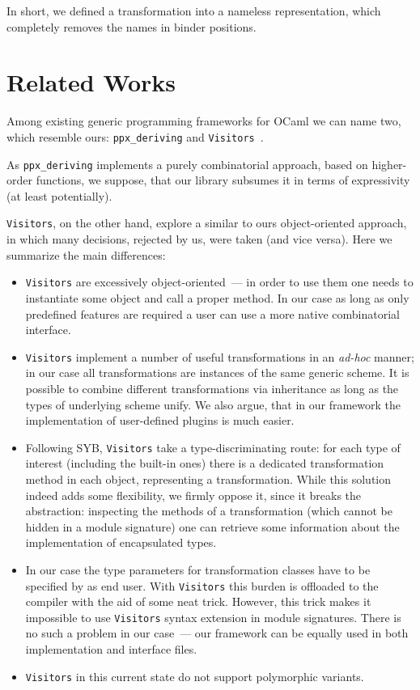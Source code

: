 \documentclass[twocolumn,8pt]{extarticle}
\newcommand{\cd}[1]{\texttt{#1}}
\begin{document}
In short, we defined a transformation into a nameless representation, which completely removes the names in binder
positions.

\section{Related Works}

Among existing generic programming frameworks for OCaml we can name two, which resemble ours: \cd{ppx\_deriving} and \cd{Visitors}~\cite{Visitors}.

As \cd{ppx\_deriving} implements a purely combinatorial approach, based on higher-order functions, we suppose, that our library subsumes it in terms
of expressivity (at least potentially).

\cd{Visitors}, on the other hand, explore a similar to ours object-oriented approach, in which many decisions, rejected by us, were taken (and vice versa). Here
we summarize the main differences:

\begin{itemize}
   \item \cd{Visitors} are excessively object-oriented~--- in order to use them one needs to instantiate some object and call a proper method. In our case as long as
     only predefined features are required a user can use a more native combinatorial interface.
     
   \item \cd{Visitors} implement a number of useful transformations in an \emph{ad-hoc} manner; in our case all transformations are instances of the
     same generic scheme. It is possible to combine different transformations via inheritance as long as the types of underlying scheme unify. We also argue, that
     in our framework the implementation of user-defined plugins is much easier.
     
   \item Following SYB, \cd{Visitors} take a type-discriminating route: for each type of interest (including the built-in ones) there is a dedicated
     transformation method in each object, representing a transformation. While this solution indeed adds some flexibility, we firmly oppose it, since it
     breaks the abstraction: inspecting the methods of a transformation (which cannot be hidden in a module signature) one can retrieve some
     information about the implementation of encapsulated types.

   \item In our case the type parameters for transformation classes have to be specified by as end user. With \cd{Visitors} this burden is offloaded to the
     compiler with the aid of some neat trick. However, this trick makes it impossible to use \cd{Visitors} syntax extension in module signatures. There is no
     such a problem in our case~--- our framework can be equally used in both implementation and interface files.

   \item \cd{Visitors} in this current state do not support polymorphic variants.
\end{itemize}
\end{document}
